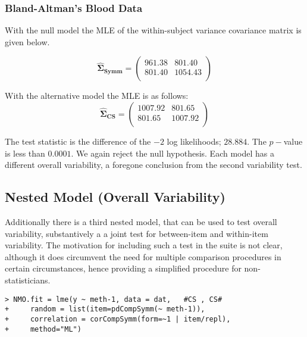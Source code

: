 \subsubsection{Bland-Altman's Blood Data}
With the null model the MLE of the within-subject variance covariance matrix is given below.

\begin{equation}
\boldsymbol{\hat{\Sigma}_{Symm}} = \left( \begin{array}{cc}
961.38 & 801.40  \\
801.40 & 1054.43  \\
\end{array}\right)
\end{equation}

With the alternative model the MLE is as follows:
\begin{equation}
\boldsymbol{\hat{\Sigma}_{CS}} = \left( \begin{array}{cc}
1007.92  & 801.65  \\
801.65  & 1007.92  \\
\end{array}\right)
\end{equation}


The test statistic is the difference of the $-2$ log likelihoods; $28.884$. The $p-$value is less than $0.0001$. We again reject the null hypothesis. Each model has a different overall variability, a foregone conclusion from the second variability test.


\subsection{Nested Model (Overall Variability)}
Additionally there is a third nested model, that can be used to test overall variability, substantively a a joint test for between-item and within-item variability. The motivation for including such a test in the suite is not clear, although it does circumvent the need for multiple comparison procedures in certain circumstances, hence providing a simplified procedure for non-statisticians.

\begin{framed}
\begin{verbatim}
> NMO.fit = lme(y ~ meth-1, data = dat,   #CS , CS# 
+     random = list(item=pdCompSymm(~ meth-1)), 
+     correlation = corCompSymm(form=~1 | item/repl), 
+     method="ML")
\end{verbatim}
\end{framed}

